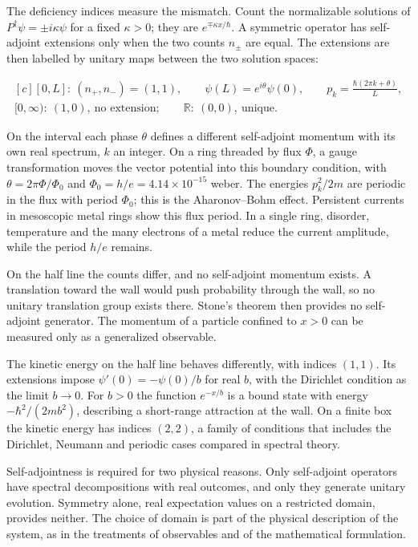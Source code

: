 \documentclass[11pt,oneside]{book}
\newenvironment{centeredalign}{\[\begin{gathered}[c]}{\end{gathered}\]}
\begin{document}
The deficiency indices measure the mismatch. Count the normalizable solutions of \(P^\dagger\psi=\pm i\kappa\psi\) for a fixed \(\kappa>0\); they are \(e^{\mp\kappa x/\hbar}\). A symmetric operator has self-adjoint extensions only when the two counts \(n_\pm\) are equal. The extensions are then labelled by unitary maps between the two solution spaces:

\begin{centeredalign}
[0,L]:\ (n_+,n_-)=(1,1),\qquad \psi(L)=e^{i\theta}\psi(0),\qquad
p_k=\frac{\hbar(2\pi k+\theta)}{L},\\
[0,\infty):\ (1,0),\ \text{no extension};\qquad
\mathbb R:\ (0,0),\ \text{unique}.
\end{centeredalign}

On the interval each phase \(\theta\) defines a different self-adjoint momentum with its own real spectrum, \(k\) an integer. On a ring threaded by flux \(\Phi\), a gauge transformation moves the vector potential into this boundary condition, with \(\theta=2\pi\Phi/\Phi_0\) and \(\Phi_0=h/e=4.14\times10^{-15}\) weber. The energies \(p_k^2/2m\) are periodic in the flux with period \(\Phi_0\); this is the Aharonov--Bohm effect. Persistent currents in mesoscopic metal rings show this flux period. In a single ring, disorder, temperature and the many electrons of a metal reduce the current amplitude, while the period \(h/e\) remains.

On the half line the counts differ, and no self-adjoint momentum exists. A translation toward the wall would push probability through the wall, so no unitary translation group exists there. Stone's theorem then provides no self-adjoint generator. The momentum of a particle confined to \(x>0\) can be measured only as a generalized observable.

The kinetic energy on the half line behaves differently, with indices \((1,1)\). Its extensions impose \(\psi'(0)=-\psi(0)/b\) for real \(b\), with the Dirichlet condition as the limit \(b\to0\). For \(b>0\) the function \(e^{-x/b}\) is a bound state with energy \(-\hbar^2/(2mb^2)\), describing a short-range attraction at the wall. On a finite box the kinetic energy has indices \((2,2)\), a family of conditions that includes the Dirichlet, Neumann and periodic cases compared in spectral theory.

Self-adjointness is required for two physical reasons. Only self-adjoint operators have spectral decompositions with real outcomes, and only they generate unitary evolution. Symmetry alone, real expectation values on a restricted domain, provides neither. The choice of domain is part of the physical description of the system, as in the treatments of observables and of the mathematical formulation.
\end{document}
